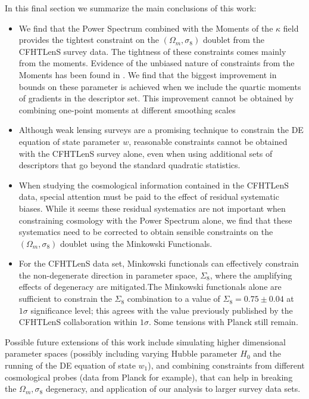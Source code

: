 \documentclass[reprint,aps,prd,superscriptaddress,showkeys,showpacs]{revtex4-1}
\begin{document}
In this final section we summarize the main conclusions of this work:
\begin{itemize}
\item We find that the Power Spectrum combined with the Moments of the $\kappa$ field provides the tightest constraint on the $(\Omega_m,\sigma_8)$ doublet from the CFHTLenS survey data. The tightness of these constraints comes mainly from the moments. Evidence of the unbiased nature of constraints from the Moments has been found in \citep{PetriSpurious}. We find that the biggest improvement in bounds on these parameter is achieved when we include the quartic moments of gradients in the descriptor set. This improvement cannot be obtained by combining one-point moments at different smoothing scales 
\item Although weak lensing surveys are a promising technique to constrain the DE equation of state parameter $w$, reasonable constraints cannot be obtained with the CFHTLenS survey alone, even when using additional sets of descriptors that go beyond the standard quadratic statistics.
\item When studying the cosmological information contained in the CFHTLenS data, special attention must be paid to the effect of residual systematic biases. While it seems these residual systematics are not important when constraining cosmology with the Power Spectrum alone, we find that these systematics need to be corrected to obtain sensible constraints on the $(\Omega_m,\sigma_8)$ doublet using the Minkowski Functionals. 
\item For the CFHTLenS data set, Minkowski functionals can effectively constrain the non-degenerate direction in parameter space, $\Sigma_8$, where the amplifying effects of degeneracy are mitigated.The Minkowski functionals alone are sufficient to constrain the $\Sigma_8$ combination to a value of $\Sigma_8=0.75\pm0.04$ at $1\sigma$ significance level; this agrees with the value previously published by the CFHTLenS collaboration within $1\sigma$. Some tensions with Planck \citep{PlanckXVI2013} still remain.  
\end{itemize}

Possible future extensions of this work include simulating higher dimensional parameter spaces (possibly including varying Hubble parameter $H_0$ and the running of the DE equation of state $w_1$), and combining constraints from different cosmological probes (data from Planck for example), that can help in breaking the $\Omega_m,\sigma_8$ degeneracy, and application of our analysis to larger survey data sets. 
\end{document}
